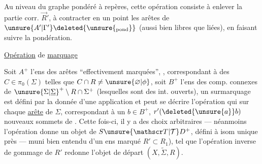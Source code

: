 Au niveau du graphe pondéré à repères, cette opération consiste à enlever   la partie corr. $\vec R'$, à contracter en un point les arêtes de $\unsure{A'|\Gamma'}\deleted{\unsure{{}_{\mathrm{pond}}}}$ (aussi bien libres que liées), en faisant suivre la pondération.

  \uline{Opération} de  \uline{marquage}


 Soit $A^+$ l'ens des arêtes  ``effectivement marquées'',  ,
correspondant à des $C\in\pi_0(\Sigma)$ telles que $C\cap R\ne\unsure{\varnothing|\phi}$, soit $B^+$ l'ens des comp. connexes de $ {\unsure{\Sigma|\underline{\Sigma}}}^{+}\setminus R\cap\Sigma^{+}$ (lesquelles sont des int. ouverts), un surmarquage est défini par la donnée d'une application
et peut se décrire   l'opération qui  sur chaque \uline{arête}  de $\Sigma$, correspondant à un $b\in B^{+}$, $r'(\deleted{\unsure{a}}b)$ nouveaux sommets de . Cette fois-ci,  il y a des choix arbitraires --- néanmoins l'opération donne un objet de $S{\unsure{\mathscr T|\mathcal T}}D^{+}$, défini  à isom unique près --- muni bien entendu d'un ens marqué $R'\subset R_{1}$), tel que l'opération inverse de gommage de $R'$ redonne l'objet de départ $(X,\widetilde{\Sigma},R)$.

